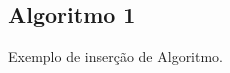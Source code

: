 
\begin{anexosenv}
\partanexos

\chapter{Algoritmo 1}     %
\label{chap:anexoA}

Exemplo de inserção de Algoritmo.



\end{anexosenv}
